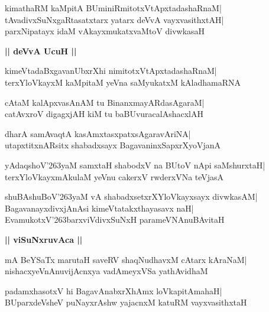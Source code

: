 \documentclass[twoside,12pt,openright]{book}
\def\S{\char'263}
\newcounter{shloka}[chapter]
\def\uvaca#1{\centerline{{\large\textbf{#1}}}}
\begin{document}
\begin{shloka}%
kimathaRM kaMpitA BUminiRmitotxVtApxtadashaRnaM|\\
tAvadivxSuNxgaRtasatxtarx yatarx deVvA vayxvasithxtAH|\\
parxNipatayx idaM vAkayxmukatxvaMtoV divwkasaH
\end{shloka}

\uvaca{|| deVvA UcuH ||}
\begin{shloka}%
kimeVtadaBxgavanUbxrXhi nimitotxVtApxtadashaRnaM|\\
terxYloVkayxM kaMpitaM yeVna saMyukatxM kAladhamaRNA
\end{shloka}

\begin{shloka}%
cAtaM kalApxvasAnAM tu BinanxmayARdasAgaraM|\\
catAvxroV digagxjAH kiM tu baBUvuracalAshacxlAH
\end{shloka}

\begin{shloka}%
dharA samAvaqtA kasAmxtasxpatxsAgaravAriNA|\\
utapxtitxnARsitx shabadxsayx BagavaninxSapxrXyoVjanA
\end{shloka}

\begin{shloka}%
yAdaqshoV\S yaM samxtaH shabodxV na BUtoV nApi saMshurxtaH|\\
terxYloVkayxmAkulaM yeVnu cakerxV rwderxVNa teVjasA
\end{shloka}

\begin{shloka}%
shuBAshuBoV\S yaM vA shabadxsetxrXYloVkayxsayx divwkasAM|\\
BagavanayxdivxjAnAsi kimeVtatakxthayasavx naH|\\
EvamukotxV\S barxviVdivxSuNxH parameVNAnuBAvitaH
\end{shloka}

\uvaca{|| viSuNxruvAca ||}
\begin{shloka}%
mA BeYSaTx marutaH saveRV shaqNudhavxM cAtarx kAraNaM|\\
nishacxyeVnAnuvijAcnxya vadAmeyxVSa yathAvidhaM
\end{shloka}

\begin{shloka}%
padamxhasotxV hi BagavAnabxrXhAmx loVkapitAmahaH|\\
BUparxdeVsheV puNayxrAshw yajacnxM katuRM vayxvasithxtaH
\end{shloka}
\end{document}
